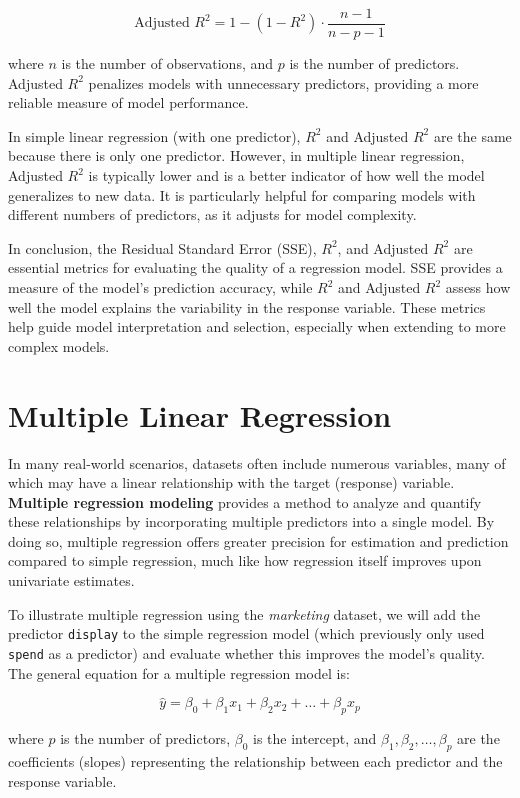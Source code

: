 \documentclass[
]{book}
\newcommand{\passthrough}[1]{#1}
\theoremstyle{definition}
\theoremstyle{definition}
\theoremstyle{definition}
\theoremstyle{definition}
\theoremstyle{remark}
\begin{document}
\[
\text{Adjusted } R^2 = 1 - \left(1 - R^2\right) \cdot \frac{n-1}{n-p-1}
\]

where \(n\) is the number of observations, and \(p\) is the number of predictors. Adjusted \(R^2\) penalizes models with unnecessary predictors, providing a more reliable measure of model performance.

In simple linear regression (with one predictor), \(R^2\) and Adjusted \(R^2\) are the same because there is only one predictor. However, in multiple linear regression, Adjusted \(R^2\) is typically lower and is a better indicator of how well the model generalizes to new data. It is particularly helpful for comparing models with different numbers of predictors, as it adjusts for model complexity.

In conclusion, the Residual Standard Error (SSE), \(R^2\), and Adjusted \(R^2\) are essential metrics for evaluating the quality of a regression model. SSE provides a measure of the model's prediction accuracy, while \(R^2\) and Adjusted \(R^2\) assess how well the model explains the variability in the response variable. These metrics help guide model interpretation and selection, especially when extending to more complex models.

\section{Multiple Linear Regression}\label{sec-multiple-regression}

In many real-world scenarios, datasets often include numerous variables, many of which may have a linear relationship with the target (response) variable. \textbf{Multiple regression modeling} provides a method to analyze and quantify these relationships by incorporating multiple predictors into a single model. By doing so, multiple regression offers greater precision for estimation and prediction compared to simple regression, much like how regression itself improves upon univariate estimates.

To illustrate multiple regression using the \emph{marketing} dataset, we will add the predictor \passthrough{\lstinline!display!} to the simple regression model (which previously only used \passthrough{\lstinline!spend!} as a predictor) and evaluate whether this improves the model's quality. The general equation for a multiple regression model is:

\[
\hat{y} = \beta_0 + \beta_1 x_1 + \beta_2 x_2 + \dots + \beta_p x_p
\]

where \(p\) is the number of predictors, \(\beta_0\) is the intercept, and \(\beta_1, \beta_2, \dots, \beta_p\) are the coefficients (slopes) representing the relationship between each predictor and the response variable.
\end{document}
